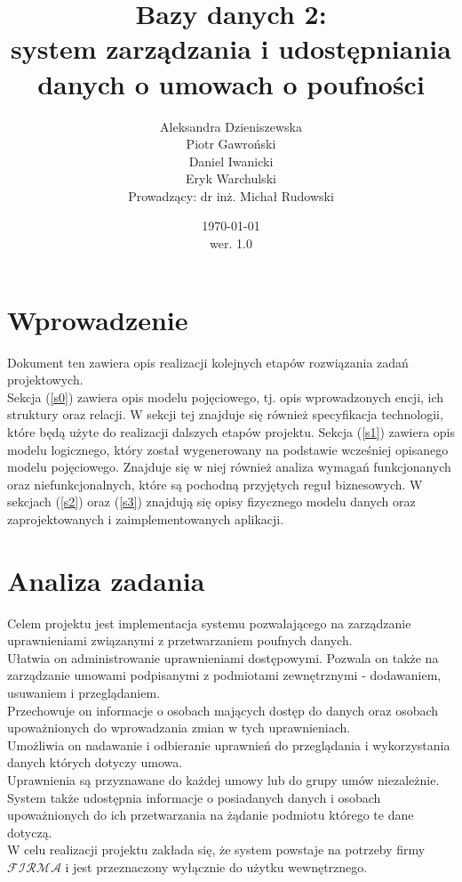 \documentclass{article}
\title{Bazy danych 2: \\ system zarządzania i udostępniania danych o umowach o poufności}
\author{Aleksandra Dzieniszewska \\ Piotr Gawroński \\ Daniel Iwanicki \\ Eryk Warchulski\\ Prowadzący: dr inż. Michał Rudowski}
\date{\today\\wer. 1.0}
\begin{document}
\maketitle
{\footnotesize{\tableofcontents}}
\vspace*{\fill}
\vspace*{\fill}
\section{Wprowadzenie}
 Dokument ten zawiera opis realizacji kolejnych etapów rozwiązania zadań projektowych.\\
 Sekcja (\ref{s0}) zawiera opis modelu pojęciowego, tj. opis wprowadzonych encji, ich struktury oraz relacji.
 W sekcji tej znajduje się również specyfikacja technologii, które będą użyte do realizacji dalszych etapów projektu.
 Sekcja (\ref{s1}) zawiera opis modelu logicznego, który został wygenerowany na podstawie wcześniej opisanego modelu pojęciowego. 
 Znajduje się w niej również analiza wymagań funkcjonanych oraz niefunkcjonalnych, które są pochodną przyjętych reguł biznesowych.
 W  sekcjach (\ref{s2}) oraz (\ref{s3}) znajdują się opisy fizycznego modelu danych oraz zaprojektowanych i zaimplementowanych aplikacji. \\
\section{Analiza zadania}
Celem projektu jest implementacja systemu pozwalającego na zarządzanie uprawnieniami związanymi z przetwarzaniem poufnych danych.\\
Ułatwia on administrowanie uprawnieniami dostępowymi. Pozwala on także na zarządzanie umowami podpisanymi z podmiotami zewnętrznymi - dodawaniem, usuwaniem i przeglądaniem.\\
Przechowuje on informacje o osobach mających dostęp do danych oraz osobach upoważnionych do wprowadzania zmian w tych uprawnieniach.\\
Umożliwia on nadawanie i odbieranie uprawnień do przeglądania i wykorzystania danych których dotyczy umowa. \\
Uprawnienia są przyznawane do każdej umowy lub do grupy umów niezależnie.\\
System także udostępnia informacje o posiadanych danych i osobach upoważnionych do ich przetwarzania na żądanie podmiotu którego te dane dotyczą.\\
W celu realizacji projektu zakłada się, że system powstaje na potrzeby firmy $\mathcal{FIRMA}$ i jest przeznaczony wyłącznie do użytku wewnętrznego.
\end{document}
